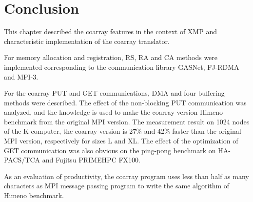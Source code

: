\section{Conclusion}\label{sec:concl}

This chapter described the coarray features in the context of XMP and 
characteristic implementation of the coarray translator.

For memory allocation and registration, RS, RA and CA methods were
implemented corresponding to the communication library GASNet, FJ-RDMA
and MPI-3.

For the coarray PUT and GET communications, DMA and four buffering methods
were described. The effect of the non-blocking PUT communication was
analyzed, and the knowledge is used to make the coarray version Himeno benchmark
from the original MPI version.
The measurement result on 1024 nodes of the K computer, the coarray version 
is 27\% and 42\% faster than the original MPI version, respectively for sizes
L and XL.
The effect of the optimization of GET communication was also obvious on 
the ping-pong benchmark on HA-PACS/TCA and Fujitsu PRIMEHPC FX100.

As an evaluation of productivity, the coarray program uses less than half as
many characters as MPI message passing program to write the same algorithm
of Himeno benchmark.

